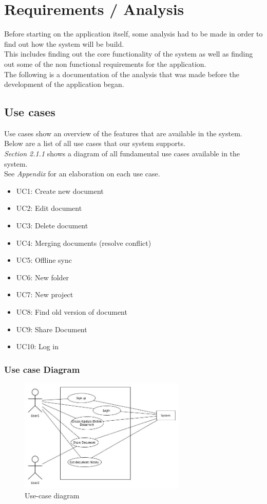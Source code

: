 \documentclass[11pt]{article}
\begin{document}
\section{Requirements / Analysis}
\label{sec-2}
Before starting on the application itself, some analysis had to be made in order to find out how the system will be build. \\
This includes finding out the core functionality of the system as well as finding out some of the non functional requirements for the application. \\
The following is a documentation of the analysis that was made before the development of the application began.
\subsection{Use cases}
\label{sec-2-1}
Use cases show an overview of the features that are available in the system. Below are a list of all use cases that our system supports. \\
\emph{Section 2.1.1} shows a diagram of all fundamental use cases available in the system. \\
See \emph{Appendix} for an elaboration on each use case. \\

\begin{itemize}
\item UC1: Create new document
\item UC2: Edit document
\item UC3: Delete document
\item UC4: Merging documents (resolve conflict)
\item UC5: Offline sync
\item UC6: New folder
\item UC7: New project
\item UC8: Find old version of document
\item UC9: Share Document
\item UC10: Log in
\end{itemize}
\subsubsection{Use case Diagram}
\label{sec-2-1-1}
\begin{figure}[H]
  		\centering
    	\includegraphics[width=300px]{images/UpdatedUsecaseDiagram.jpg}
    	\caption{Use-case diagram}
	\end{figure}
\end{document}
